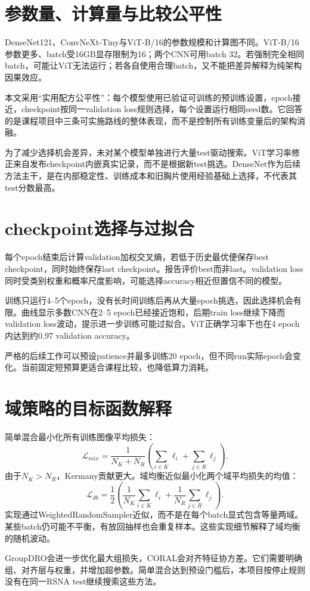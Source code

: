 \section{参数量、计算量与比较公平性}

DenseNet121、ConvNeXt-Tiny与ViT-B/16的参数规模和计算图不同。ViT-B/16参数更多、batch受16GB显存限制为16；两个CNN可用batch 32。若强制完全相同batch，可能让ViT无法运行；若各自使用合理batch，又不能把差异解释为纯架构因果效应。

本文采用“实用配方公平性”：每个模型使用已验证可训练的预训练设置，epoch接近，checkpoint按同一validation loss规则选择，每个设置运行相同seed数。它回答的是课程项目中三条可实施路线的整体表现，而不是控制所有训练变量后的架构消融。

为了减少选择机会差异，未对某个模型单独进行大量test驱动搜索。ViT学习率修正来自发布checkpoint内嵌真实记录，而不是根据新test挑选。DenseNet作为后续方法主干，是在内部稳定性、训练成本和旧胸片使用经验基础上选择，不代表其test分数最高。

\section{checkpoint选择与过拟合}

每个epoch结束后计算validation加权交叉熵，若低于历史最优便保存best checkpoint，同时始终保存last checkpoint。报告评价best而非last。validation loss同时受类别权重和概率尺度影响，可能选择accuracy相近但置信不同的模型。

训练只运行4--5个epoch，没有长时间训练后再从大量epoch挑选，因此选择机会有限。曲线显示多数CNN在2--5 epoch已经接近饱和，后期train loss继续下降而validation loss波动，提示进一步训练可能过拟合。ViT正确学习率下也在4 epoch内达到约0.97 validation accuracy。

严格的后续工作可以预设patience并最多训练20 epoch，但不同run实际epoch会变化。当前固定短预算更适合课程比较，也降低算力消耗。

\section{域策略的目标函数解释}

简单混合最小化所有训练图像平均损失：
\begin{equation}
\mathcal{L}_{mix}=\frac{1}{N_K+N_R}\left(\sum_{i\in K}\ell_i+\sum_{j\in R}\ell_j\right).
\end{equation}
由于$N_K>N_R$，Kermany贡献更大。域均衡近似最小化两个域平均损失的均值：
\begin{equation}
\mathcal{L}_{db}=\frac{1}{2}\left(\frac{1}{N_K}\sum_{i\in K}\ell_i+\frac{1}{N_R}\sum_{j\in R}\ell_j\right).
\end{equation}
实现通过WeightedRandomSampler近似，而不是在每个batch显式包含等量两域。某些batch仍可能不平衡，有放回抽样也会重复样本。这些实现细节解释了域均衡的随机波动。

GroupDRO会进一步优化最大组损失，CORAL会对齐特征协方差。它们需要明确组、对齐层与权重，并增加超参数。简单混合达到预设门槛后，本项目按停止规则没有在同一RSNA test继续搜索这些方法。
